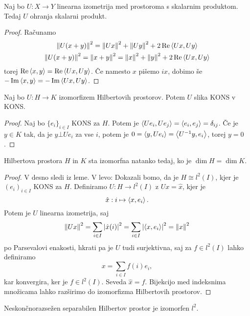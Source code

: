 \begin{trditev}
  Naj bo $U: X \to Y$ linearna izometrija med prostoroma s skalarnim produktom.
  Tedaj $U$ ohranja skalarni produkt.
\end{trditev}

\begin{proof}
  Računamo
  \begin{gather*}
	\left\lVert U(x+y)\right\rVert^2 = \left\lVert Ux\right\rVert^2 + \left\lVert Uy\right\rVert^2 + 2 \operatorname{Re} \left< Ux, Uy \right> \\
	\left\lVert U(x+y)\right\rVert^2 = \left\lVert x+y\right\rVert^2 = \left\lVert x\right\rVert^2 + \left\lVert y\right\rVert^2 + 2 \operatorname{Re} \left< Ux, Uy \right>
  \end{gather*}
  torej $\operatorname{Re} \left< x,y \right> = \operatorname{Re} \left< Ux, Uy \right>$.
  Če namesto $x$ pišemo $ix$, dobimo še $- \operatorname{Im} \left< x,y \right> = - \operatorname{Im} \left< Ux,
	Uy \right>$.
\end{proof}

\begin{lema}
  Naj bo $U: H \to K$ izomorfizem Hilbertovih prostorov.
  Potem $U$ slika KONS v KONS.
\end{lema}

\begin{proof}
  Naj bo $\{e_i\}_{i \in I}$ KONS za $H$.
  Potem je $\left< Ue_i, U e_j \right> = \left< e_i, e_j \right> = \delta_{ij}$.
  Če je $y \in K$ tak, da je $y \bot U e_i$ za vse $i$, potem je $0 = \left< y, U
	e_i \right> = \left< U^{-1} y, e_i \right>$, torej $y = 0$.
\end{proof}

\begin{izrek}
  Hilbertova prostora $H$ in $K$ sta izomorfna natanko tedaj, ko je $\dim H =
  \dim K$.
\end{izrek}

\begin{proof}
  V desno sledi iz leme.
  V levo:
  Dokazali bomo, da je $H \cong l^2(I)$, kjer je $(e_i)_{i \in I}$ KONS za $H$.
  Definiramo $U: H \to l^2(I)$ z $Ux = \hat{x}$, kjer je
  \[
	\hat{x}: i \mapsto \left< x, e_i \right>.
  \]
  Potem je $U$ linearna izometrija, saj
  \[
	\left\lVert Ux\right\rVert^2 = \sum_{i \in I} \left| \hat{x}(i) \right|^2 = \sum_{i \in I} \left| \left< x,
	  e_i \right> \right|^2 = \left\lVert x\right\rVert^2
  \]
  po Parsevalovi enakosti, hkrati pa je $U$ tudi surjektivna, saj za $f \in
  l^2(I)$ lahko definiramo
  \[
	x = \sum_{i \in I} f(i) e_i,
  \]
  kar konvergira, ker je $f \in l^2(I)$.
  Seveda $\hat{x} = f$.
  Bijekcijo med indeksnima množicama lahko razširimo do izomorfizma Hilbertovih
  prostorov.
\end{proof}

\begin{posledica}
  Neskončnorazsežen separabilen Hilbertov prostor je izomorfen $l^2$.
\end{posledica}

